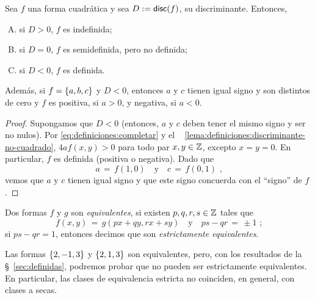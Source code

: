 \begin{teoDefiniciones}\label{teo:definiciones:valores}
	Sea $f$ una forma cuadr\'atica y sea $D:=\mathsf{disc}(f)$,
	su discriminante. Entonces,
	\begin{enumerate}[(A)]
		\item\label{item:definiciones:valores:indefinida}
			si $D>0$, $f$ es indefinida;
		\item\label{item:definiciones:valores:semidefinida}
			si $D=0$, $f$ es semidefinida, pero no definida;
		\item\label{item:definiciones:valores:definida}
			si $D<0$, $f$ es definida.
	\end{enumerate}
	Adem\'as, si $f=\left\{a,b,c\right\}$ y $D<0$, entonces $a$ y $c$
	tienen igual signo y son distintos de cero y $f$ es positiva,
	si $a>0$, y negativa, si $a<0$.
\end{teoDefiniciones}

\begin{proof}
	Supongamos que $D<0$
	(entonces, $a$ y $c$ deben tener el mismo signo y
	ser no nulos).
	Por \eqref{eq:definiciones:completar} y el \lemaname~%
	\ref{lema:definiciones:discriminante-no-cuadrado},
	$4af(x,y)>0$ para todo par $x,y\in\mathbb{Z}$, excepto
	$x=y=0$. En particular, $f$ es definida (positiva o
	negativa). Dado que
	\begin{displaymath}
		a\,=\,f(1,0)\quad\text{y}\quad
			c\,=\,f(0,1)
		\text{ ,}
	\end{displaymath}
	vemos que $a$ y $c$ tienen igual signo y que este
	signo concuerda con el ``signo'' de $f$.
\end{proof}

\begin{defDefiniciones}\label{def:definiciones:equivalencia}
	Dos formas $f$ y $g$ son \emph{equivalentes}, si existen
	$p,q,r,s\in\mathbb{Z}$ tales que
	\begin{displaymath}
		f(x,y)\,=\,g(px+qy,rx+sy)
		\quad\text{y}\quad
		ps-qr\,=\,\pm 1
		\text{ ;}
	\end{displaymath}
	si $ps-qr=1$, entonces decimos que son
	\emph{estrictamente equivalentes}.
\end{defDefiniciones}

\begin{ejemDefiniciones}\label{ejem:definiciones:equivalencia}
	Las formas $\left\{2,-1,3\right\}$ y $\left\{2,1,3\right\}$ son equivalentes,
	pero, con los resultados de la \S~\ref{sec:definidas}, podremos
	probar que no pueden ser estrictamente equivalentes.
	En particular, las clases de equivalencia estricta no coinciden,
	en general, con clases a secas.
\end{ejemDefiniciones}

